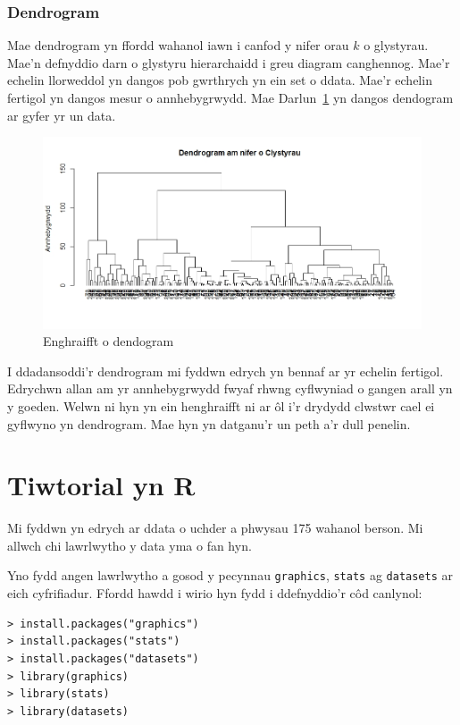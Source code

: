 \subsubsection{Dendrogram}

Mae dendrogram yn ffordd wahanol iawn i canfod y nifer orau $k$ o glystyrau. Mae'n defnyddio darn o glystyru hierarchaidd i greu diagram canghennog. Mae'r echelin llorweddol yn dangos pob gwrthrych yn ein set o ddata. Mae'r echelin fertigol yn dangos mesur o annhebygrwydd. Mae Darlun~\ref{fig:dendogram} yn dangos dendogram ar gyfer yr un data.

\begin{figure}[H]
\begin{center}
\includegraphics[width=0.5\linewidth]{../img/Dendrogram.jpeg}
\end{center}
\caption{Enghraifft o dendogram}
\label{fig:dendogram}
\end{figure}

I ddadansoddi'r dendrogram mi fyddwn edrych yn bennaf ar yr echelin fertigol. Edrychwn allan am yr annhebygrwydd fwyaf rhwng cyflwyniad o gangen arall yn y goeden. Welwn ni hyn yn ein henghraifft ni ar ôl i'r drydydd clwstwr cael ei gyflwyno yn dendrogram. Mae hyn yn datganu'r un peth a'r dull penelin.

\section{Tiwtorial yn R}
Mi fyddwn yn edrych ar ddata o uchder a phwysau 175 wahanol berson. Mi allwch chi lawrlwytho y data yma o fan hyn. %

Yno fydd angen lawrlwytho a gosod y pecynnau \texttt{graphics}, \texttt{stats} ag \texttt{datasets} ar eich cyfrifiadur. Ffordd hawdd i wirio hyn fydd i ddefnyddio'r c\^{o}d canlynol: 

\begin{verbatim}
> install.packages("graphics")
> install.packages("stats")
> install.packages("datasets")
> library(graphics)
> library(stats)
> library(datasets)
\end{verbatim}

